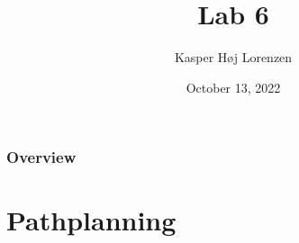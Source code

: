\documentclass{beamer}
\title[Pathplanning]{Lab 6} %
\author{Kasper Høj Lorenzen} %
\institute[SDU Robotics] %
{
University of Southern Denmark \\ %
\medskip
\textit{kalor@mmmi.sdu.dk} %
}
\date{October 13, 2022} %
\begin{document}
\begin{frame}
\titlepage %
\end{frame}

\begin{frame}
\frametitle{Overview} %
\tableofcontents %
\end{frame}


\section{Pathplanning}
\end{document}
